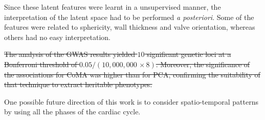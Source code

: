 \documentclass[twocolumn]{llncs}
\newcommand{\NIMP}{10,000,000\,} %
\newcommand{\NGWASHITS}{10}
\begin{document}
Since these latent features were learnt in a unsupervised manner, the interpretation of the latent space had to be performed \emph{a posteriori}. Some of the features were related to sphericity, wall thickness and valve orientation, whereas others had no easy interpretation.

\st{The analysis of the GWAS results yielded $\NGWASHITS$ significant genetic loci at a Bonferroni threshold of $0.05/(\NIMP\times8)$. Moreover, the significance of the associations for CoMA was higher than for PCA, confirming the suitability of that technique to extract heritable phenotypes.}

One possible future direction of this work is to consider spatio-temporal patterns by using all the phases of the cardiac cycle.

\newpage

%
% 
% 
%
\end{document}
